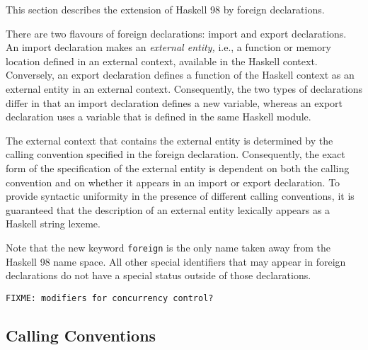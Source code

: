 \documentclass[a4paper,twosides]{article}
\newcommand{\code}[1]{\texttt{#1}}
\begin{document}
This section describes the extension of Haskell 98 by foreign declarations.
%
\begin{grammar}
\end{grammar}
%
There are two flavours of foreign declarations: import and export
declarations.  An import declaration makes an \emph{external entity,} i.e., a
function or memory location defined in an external context, available in the
Haskell context.  Conversely, an export declaration defines a function of the
Haskell context as an external entity in an external context.  Consequently,
the two types of declarations differ in that an import declaration defines a
new variable, whereas an export declaration uses a variable that is defined
in the same Haskell module.

The external context that contains the external entity is determined by the
calling convention specified in the foreign declaration.  Consequently, the
exact form of the specification of the external entity is dependent on both
the calling convention and on whether it appears in an import or export
declaration.  To provide syntactic uniformity in the presence of different
calling conventions, it is guaranteed that the description of an external
entity lexically appears as a Haskell string lexeme.

Note that the new keyword \code{foreign} is the only name taken away from the
Haskell 98 name space.  All other special identifiers that may appear in
foreign declarations do not have a special status outside of those
declarations.

\begin{verbatim}
FIXME: modifiers for concurrency control?
\end{verbatim}

\subsection{Calling Conventions}
\label{sec:call-conv}
\end{document}
